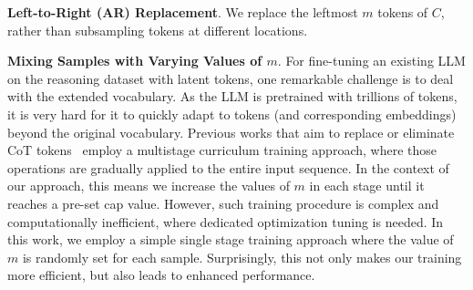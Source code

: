 \textbf{Left-to-Right (AR) Replacement}. We replace the leftmost $m$ tokens of $C$, rather than subsampling tokens at different locations. 

\textbf{Mixing Samples with Varying Values of $m$}. For fine-tuning an existing LLM on the reasoning dataset with latent tokens, one remarkable challenge is to deal with the extended vocabulary. As the LLM is pretrained with trillions of tokens,
it is very hard for it to quickly adapt to tokens (and corresponding embeddings) beyond the original vocabulary. Previous works that aim to replace or eliminate CoT tokens~\cite{deng2024explicit, hao2024training} employ a multistage curriculum training approach, where those operations are gradually applied to the entire input sequence. In the context of our approach, this means we increase the values of $m$ in each stage until it reaches a pre-set cap value. However, such training procedure is complex and computationally inefficient, where dedicated optimization tuning is needed. In this work, we employ a simple single stage training approach where the value of $m$ is randomly set for each sample. Surprisingly, this not only makes our training more efficient, but also leads to enhanced performance. 